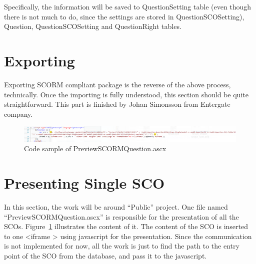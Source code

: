 Specifically, the information will be saved to QuestionSetting table (even though there is not much to do, since the settings are stored in QuestionSCOSetting), Question, QuestionSCOSetting and QuestionRight tables.
\section{Exporting}
Exporting SCORM compliant package is the reverse of the above process, technically. Once the importing is fully understood, this section should be 
quite straightforward. This part is finished by Johan Simonsson from Entergate company.
\begin{figure}[t]
	\begin{center}
		\includegraphics[scale=0.3]{preview_sco_code.png}
	\end{center}
	\caption{Code sample of PreviewSCORMQuestion.ascx}
	\label{fig:preview_sco_code}
\end{figure}
\section{Presenting Single SCO}
In this section, the work will be around ``Public'' project. One file named ``PreviewSCORMQuestion.ascx'' is responsible for the presentation of all 
the SCOs. Figure~\ref{fig:preview_sco_code} illustrates the content of it. The content of the SCO is inserted to one \textless iframe \textgreater 
using javascript for the presentation. Since the communication is not implemented for now, all the work is just to find the path to the entry point 
of the SCO from the database, and pass it to the javascript.
